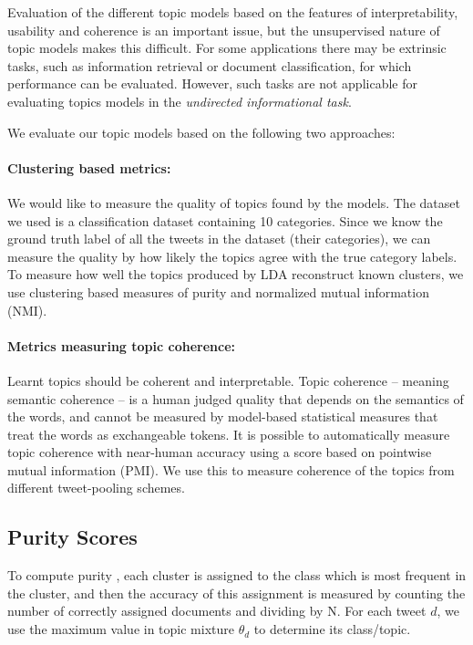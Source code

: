 \documentclass[10pt,a5paper,twoside]{article}
\begin{document}
\label{sec:evaluation}

Evaluation of the different topic models based on the features of
interpretability, usability and coherence is an important issue, but
the unsupervised nature of topic models makes this difficult. For some
applications there may be extrinsic tasks, such as information
retrieval or document classification, for which performance can be
evaluated. However, such tasks are not applicable for evaluating
topics models in the {\it undirected informational task}.

We evaluate our topic models based on the following two approaches:

\paragraph{Clustering based metrics:} 

We would like to measure the quality of topics found by the
models. The dataset we used is a classification dataset containing 10
categories. Since we know the ground truth label of all the tweets in
the dataset (their categories), we can measure the quality by how
likely the topics agree with the true category labels. To measure how
well the topics produced by LDA reconstruct known clusters, we use
clustering based measures of purity and normalized mutual information
(NMI).

\paragraph{Metrics measuring topic coherence:}

Learnt topics should be coherent and interpretable.  Topic coherence –
meaning semantic coherence – is a human judged quality that depends on
the semantics of the words, and cannot be measured by model-based
statistical measures that treat the words as exchangeable tokens.  It
is possible to automatically measure topic coherence with near-human
accuracy \cite{baldwin10} using a score based on pointwise mutual
information (PMI).  We use this to measure coherence of the topics
from different tweet-pooling schemes.

\subsection{Purity Scores}

To compute purity \cite{MRS08}, each cluster is assigned to the class
which is most frequent in the cluster, and then the accuracy of this
assignment is measured by counting the number of correctly assigned
documents and dividing by N. For each tweet $d$, we use the maximum
value in topic mixture $\theta_{d} $ to determine its class/topic.
\end{document}
